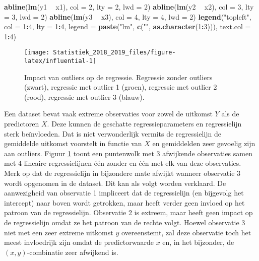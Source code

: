 \documentclass[12pt,dutch,coursenotes]{book}
\newenvironment{Shaded}{\begin{snugshade}}{\end{snugshade}}
\newcommand{\KeywordTok}[1]{\textcolor[rgb]{0.13,0.29,0.53}{\textbf{#1}}}
\newcommand{\DataTypeTok}[1]{\textcolor[rgb]{0.13,0.29,0.53}{#1}}
\newcommand{\DecValTok}[1]{\textcolor[rgb]{0.00,0.00,0.81}{#1}}
\newcommand{\StringTok}[1]{\textcolor[rgb]{0.31,0.60,0.02}{#1}}
\newcommand{\OperatorTok}[1]{\textcolor[rgb]{0.81,0.36,0.00}{\textbf{#1}}}
\newcommand{\NormalTok}[1]{#1}
\theoremstyle{definition}
\theoremstyle{definition}
\theoremstyle{definition}
\theoremstyle{remark}
\begin{document}
\begin{Shaded}
\begin{Highlighting}[]
\KeywordTok{abline}\NormalTok{(}\KeywordTok{lm}\NormalTok{(y1 }\OperatorTok{~}\StringTok{ }\NormalTok{x1), }\DataTypeTok{col =} \DecValTok{2}\NormalTok{, }\DataTypeTok{lty =} \DecValTok{2}\NormalTok{, }\DataTypeTok{lwd =} \DecValTok{2}\NormalTok{)}
\KeywordTok{abline}\NormalTok{(}\KeywordTok{lm}\NormalTok{(y2 }\OperatorTok{~}\StringTok{ }\NormalTok{x2), }\DataTypeTok{col =} \DecValTok{3}\NormalTok{, }\DataTypeTok{lty =} \DecValTok{3}\NormalTok{, }\DataTypeTok{lwd =} \DecValTok{2}\NormalTok{)}
\KeywordTok{abline}\NormalTok{(}\KeywordTok{lm}\NormalTok{(y3 }\OperatorTok{~}\StringTok{ }\NormalTok{x3), }\DataTypeTok{col =} \DecValTok{4}\NormalTok{, }\DataTypeTok{lty =} \DecValTok{4}\NormalTok{, }\DataTypeTok{lwd =} \DecValTok{2}\NormalTok{)}
\KeywordTok{legend}\NormalTok{(}\StringTok{"topleft"}\NormalTok{, }\DataTypeTok{col =} \DecValTok{1}\OperatorTok{:}\DecValTok{4}\NormalTok{, }\DataTypeTok{lty =} \DecValTok{1}\OperatorTok{:}\DecValTok{4}\NormalTok{, }\DataTypeTok{legend =} \KeywordTok{paste}\NormalTok{(}\StringTok{"lm"}\NormalTok{, }
    \KeywordTok{c}\NormalTok{(}\StringTok{""}\NormalTok{, }\KeywordTok{as.character}\NormalTok{(}\DecValTok{1}\OperatorTok{:}\DecValTok{3}\NormalTok{))), }\DataTypeTok{text.col =} \DecValTok{1}\OperatorTok{:}\DecValTok{4}\NormalTok{)}
\end{Highlighting}
\end{Shaded}

\begin{figure}

{\centering \texttt{[image: Statistiek\_2018\_2019\_files/figure-latex/influential-1]} 

}

\caption{Impact van outliers op de regressie. Regressie zonder outliers (zwart), regressie met outlier 1 (groen), regressie met outlier 2 (rood), regressie met outlier 3 (blauw).}\label{fig:influential}
\end{figure}

Een dataset bevat vaak extreme observaties voor zowel de uitkomst \(Y\)
als de predictoren \(X\). Deze kunnen de geschatte regressieparameters
en regressielijn sterk beïnvloeden. Dat is niet verwonderlijk vermits de
regressielijn de gemiddelde uitkomst voorstelt in functie van \(X\) en
gemiddelden zeer gevoelig zijn aan outliers. Figuur
\ref{fig:influential} toont een puntenwolk met 3 afwijkende observaties
samen met 4 lineaire regressielijnen één zonder en één met elk van deze
observaties. Merk op dat de regressielijn in bijzondere mate afwijkt
wanneer observatie 3 wordt opgenomen in de dataset. Dit kan als volgt
worden verklaard. De aanwezigheid van observatie 1 impliceert dat de
regressielijn (en bijgevolg het intercept) naar boven wordt getrokken,
maar heeft verder geen invloed op het patroon van de regressielijn.
Observatie 2 is extreem, maar heeft geen impact op de regressielijn
omdat ze het patroon van de rechte volgt. Hoewel observatie 3 niet met
een zeer extreme uitkomst \(y\) overeenstemt, zal deze observatie toch
het meest invloedrijk zijn omdat de predictorwaarde \(x\) en, in het
bijzonder, de \((x,y)\)-combinatie zeer afwijkend is.
\end{document}
